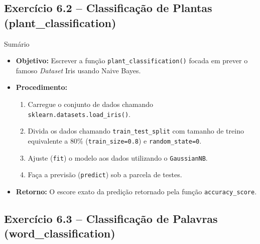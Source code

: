 \documentclass[11pt,a4paper]{article}
\begin{document}
\subsection*{Exercício 6.2 -- Classificação de Plantas (plant\_classification)}

\begin{exercicio}{Sumário}
\begin{itemize}
    \item \textbf{Objetivo:} Escrever a função \texttt{plant\_classification()} focada em prever o famoso \textit{Dataset} Iris usando Naive Bayes.
    \item \textbf{Procedimento:}
    \begin{enumerate}
        \item Carregue o conjunto de dados chamando \texttt{sklearn.datasets.load\_iris()}.
        \item Divida os dados chamando \texttt{train\_test\_split} com tamanho de treino equivalente a 80\% (\texttt{train\_size=0.8}) e \texttt{random\_state=0}.
        \item Ajuste (\texttt{fit}) o modelo aos dados utilizando o \texttt{GaussianNB}.
        \item Faça a previsão (\texttt{predict}) sob a parcela de testes.
    \end{enumerate}
    \item \textbf{Retorno:} O escore exato da predição retornado pela função \texttt{accuracy\_score}.
\end{itemize}
\end{exercicio}

\subsection*{Exercício 6.3 -- Classificação de Palavras (word\_classification)}
\end{document}
